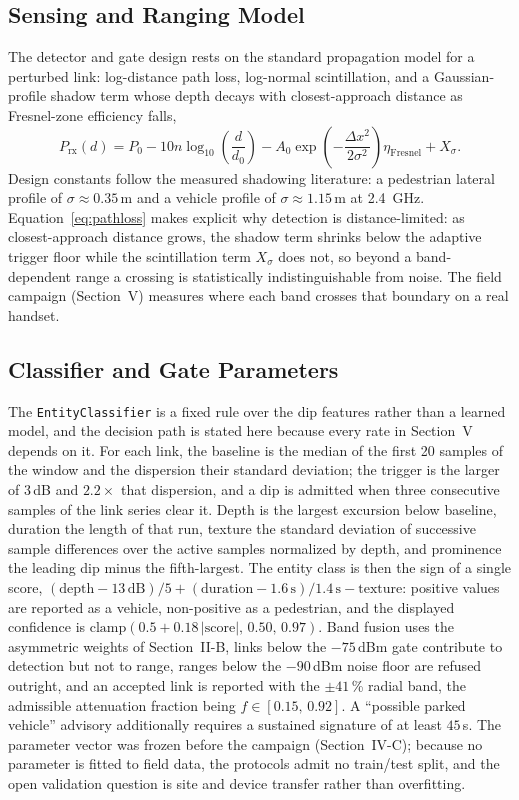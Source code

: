\documentclass[journal,10pt]{IEEEtran}
\begin{document}
\subsection{Sensing and Ranging Model}
\label{sec:model}
The detector and gate design rests on the standard propagation model for a
perturbed link: log-distance path loss, log-normal scintillation, and a
Gaussian-profile shadow term whose depth decays with closest-approach
distance as Fresnel-zone efficiency falls,
{\small
\begin{equation}
P_{\mathrm{rx}}(d) = P_0 - 10n \log_{10}\left(\frac{d}{d_0}\right) - A_0 \exp\left(-\frac{\Delta x^2}{2\sigma^2}\right) \eta_{\mathrm{Fresnel}} + X_\sigma .
\label{eq:pathloss}
\end{equation}}
Design constants follow the measured shadowing literature: a pedestrian
lateral profile of $\sigma \approx 0.35$\,m and a vehicle profile of
$\sigma \approx 1.15$\,m at 2.4~GHz. Equation~\eqref{eq:pathloss} makes
explicit why detection is distance-limited: as closest-approach distance
grows, the shadow term shrinks below the adaptive trigger floor while the
scintillation term $X_\sigma$ does not, so beyond a band-dependent range a
crossing is statistically indistinguishable from noise. The field campaign
(Section~V) measures where each band crosses that boundary on a real
handset.

\subsection{Classifier and Gate Parameters}
The \texttt{EntityClassifier} is a fixed rule over the dip features rather than a
learned model, and the decision path is stated here because every rate in
Section~V depends on it. For each link, the baseline is the median of the first
20 samples of the window and the dispersion their standard deviation; the trigger
is the larger of $3$\,dB and $2.2\times$ that dispersion, and a dip is admitted
when three consecutive samples of the link series clear it. Depth is the largest
excursion below baseline, duration the length of that run, texture the standard
deviation of successive sample differences over the active samples normalized by
depth, and prominence the leading dip minus the fifth-largest. The entity class
is then the sign of a single score,
$(\text{depth}-13\,\mathrm{dB})/5+(\text{duration}-1.6\,\mathrm{s})/1.4\,\mathrm{s}-\text{texture}$:
positive values are reported as a vehicle, non-positive as a pedestrian, and the
displayed confidence is $\mathrm{clamp}(0.5+0.18\,|\text{score}|,\,0.50,\,0.97)$.
Band fusion uses the asymmetric weights of Section~II-B, links below the
$-75$\,dBm gate contribute to detection but not to range, ranges below the
$-90$\,dBm noise floor are refused outright, and an accepted link is reported
with the $\pm41$\,\% radial band, the admissible attenuation fraction being
$f \in [0.15,\,0.92]$. A ``possible parked vehicle'' advisory
additionally requires a sustained signature of at least $45$\,s. The parameter
vector was frozen before the campaign (Section~IV-C); because no parameter is
fitted to field data, the protocols admit no train/test split, and the open
validation question is site and device transfer rather than overfitting.
\end{document}

